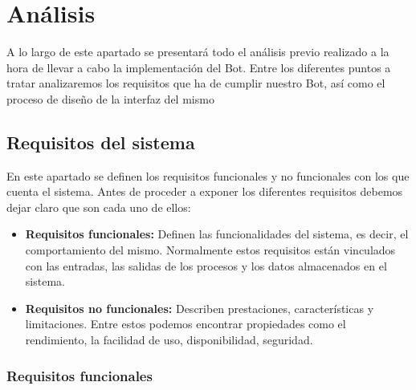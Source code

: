 \chapter{Análisis}

A lo largo de este apartado se presentará todo el análisis previo realizado a la hora de llevar a cabo la implementación del Bot. Entre los diferentes puntos a tratar analizaremos los requisitos que ha de cumplir nuestro Bot, así como el proceso de diseño de la interfaz del mismo

\section{Requisitos del sistema}

En este apartado se definen los requisitos funcionales y no funcionales con los que cuenta el sistema. Antes de proceder a exponer los diferentes requisitos debemos dejar claro que son cada uno de ellos:

\begin{itemize}
	\item \textbf{Requisitos funcionales:} Definen las funcionalidades del sistema, es decir, el comportamiento del mismo. Normalmente estos requisitos están vinculados con las entradas, las salidas de los procesos y los datos almacenados en el sistema.
	\item \textbf{Requisitos no funcionales:} Describen prestaciones, características y limitaciones. Entre estos podemos encontrar propiedades como el rendimiento, la facilidad de uso, disponibilidad, seguridad.
\end{itemize}

\subsection{Requisitos funcionales}

